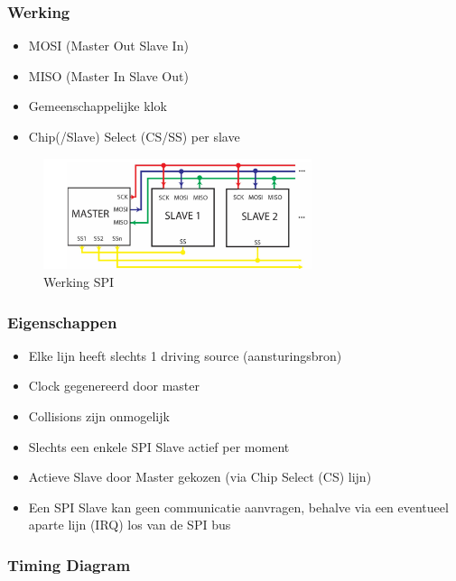 \documentclass{article}
\begin{document}
\subsubsection{Werking}
\begin{itemize}
    \item MOSI (Master Out Slave In)
    \item MISO (Master In Slave Out)
    \item Gemeenschappelijke klok
    \item Chip(/Slave) Select (CS/SS) per slave
\end{itemize}

\begin{figure}[H]
    \centering
    \includegraphics[width=0.7\textwidth]{Screenshot_20200330_113936.png}
    \caption{Werking SPI}
\end{figure}

\subsubsection{Eigenschappen}

\begin{itemize}
    \item Elke lijn heeft slechts 1 driving source (aansturingsbron)
    \item Clock gegenereerd door master
    \item Collisions zijn onmogelijk
    \item Slechts een enkele SPI Slave actief per moment
    \item Actieve Slave door Master gekozen (via Chip Select (CS) lijn)
    \item Een SPI Slave kan geen communicatie aanvragen, behalve via een eventueel aparte lijn (IRQ) los van de SPI bus
\end{itemize}

\subsubsection{Timing Diagram}
\end{document}
